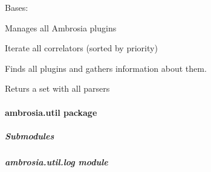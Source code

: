\documentclass[letterpaper,10pt,english]{sphinxmanual}
\begin{document}
\begin{fulllineitems}
\label{ambrosia.plugins:ambrosia.plugins.PluginManager}
Bases: 

Manages all Ambrosia plugins

\begin{fulllineitems}
\label{ambrosia.plugins:ambrosia.plugins.PluginManager.correlators}
Iterate all correlators (sorted by priority)

\end{fulllineitems}


\begin{fulllineitems}
\label{ambrosia.plugins:ambrosia.plugins.PluginManager.find}
Finds all plugins and gathers information about them.

\end{fulllineitems}


\begin{fulllineitems}
\label{ambrosia.plugins:ambrosia.plugins.PluginManager.parsers}
Returs a set with all parsers

\end{fulllineitems}


\end{fulllineitems}



\paragraph{ambrosia.util package}
\label{ambrosia.util::doc}\label{ambrosia.util:ambrosia-util-package}

\subparagraph{Submodules}
\label{ambrosia.util:submodules}

\subparagraph{ambrosia.util.log module}
\label{ambrosia.util:module-ambrosia.util.log}\label{ambrosia.util:ambrosia-util-log-module}
\end{document}
